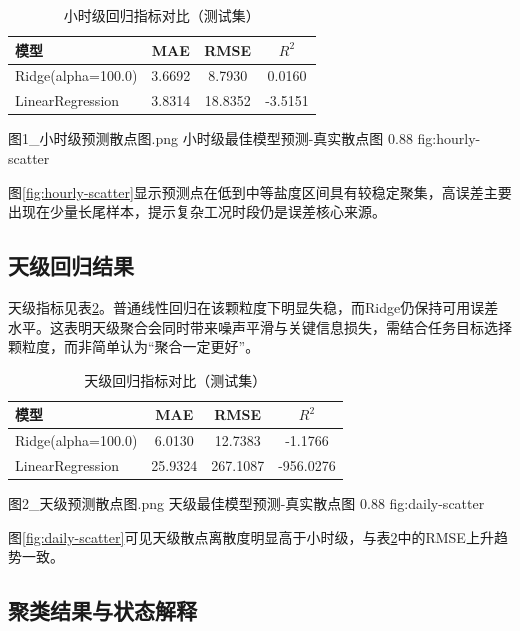 \begin{table}[htbp]
    \centering
    \caption{小时级回归指标对比（测试集）}
    \label{tab:hourly-metrics}
    \begin{tabular}{lccc}
        \toprule
        模型 & MAE & RMSE & $R^2$ \\
        \midrule
        Ridge(alpha=100.0) & 3.6692 & 8.7930 & 0.0160 \\
        LinearRegression & 3.8314 & 18.8352 & -3.5151 \\
        \bottomrule
    \end{tabular}
\end{table}

            {图1_小时级预测散点图.png}
            {小时级最佳模型预测-真实散点图}
            {0.88}
            {fig:hourly-scatter}

图\ref{fig:hourly-scatter}显示预测点在低到中等盐度区间具有较稳定聚集，高误差主要出现在少量长尾样本，提示复杂工况时段仍是误差核心来源。

\subsection{天级回归结果}

天级指标见表\ref{tab:daily-metrics}。普通线性回归在该颗粒度下明显失稳，而Ridge仍保持可用误差水平。这表明天级聚合会同时带来噪声平滑与关键信息损失，需结合任务目标选择颗粒度，而非简单认为“聚合一定更好”。

\begin{table}[htbp]
    \centering
    \caption{天级回归指标对比（测试集）}
    \label{tab:daily-metrics}
    \begin{tabular}{lccc}
        \toprule
        模型 & MAE & RMSE & $R^2$ \\
        \midrule
        Ridge(alpha=100.0) & 6.0130 & 12.7383 & -1.1766 \\
        LinearRegression & 25.9324 & 267.1087 & -956.0276 \\
        \bottomrule
    \end{tabular}
\end{table}

            {图2_天级预测散点图.png}
            {天级最佳模型预测-真实散点图}
            {0.88}
            {fig:daily-scatter}

图\ref{fig:daily-scatter}可见天级散点离散度明显高于小时级，与表\ref{tab:daily-metrics}中的RMSE上升趋势一致。

\subsection{聚类结果与状态解释}

